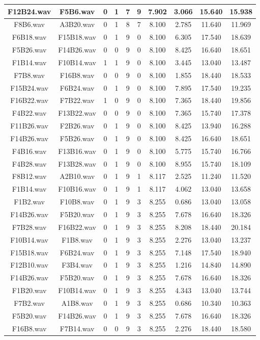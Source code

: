 \documentclass[11pt,a4paper]{book}
\begin{document}
\begin{longtable}[c]{|c|c|c|c|c|c|c|c|c|c|}
F12B24.wav&F5B6.wav&0&1&7&9&7.902&3.066&15.640&15.938\\ \hline
F8B6.wav&A3B20.wav&0&1&8&7&8.100&2.785&11.640&11.969\\ \hline
F6B18.wav&F15B18.wav&0&1&9&0&8.100&6.305&17.540&18.639\\ \hline
F5B26.wav&F14B26.wav&0&0&9&0&8.100&8.425&16.640&18.651\\ \hline
F1B14.wav&F10B14.wav&1&1&9&0&8.100&3.445&13.040&13.487\\ \hline
F7B8.wav&F16B8.wav&0&0&9&0&8.100&1.855&18.440&18.533\\ \hline
F15B24.wav&F6B24.wav&0&1&9&0&8.100&7.895&17.540&19.235\\ \hline
F16B22.wav&F7B22.wav&1&0&9&0&8.100&7.365&18.440&19.856\\ \hline
F4B22.wav&F13B22.wav&0&0&9&0&8.100&7.365&15.740&17.378\\ \hline
F11B26.wav&F2B26.wav&0&1&9&0&8.100&8.425&13.940&16.288\\ \hline
F14B26.wav&F5B26.wav&0&1&9&0&8.100&8.425&16.640&18.651\\ \hline
F4B16.wav&F13B16.wav&0&1&9&0&8.100&5.775&15.740&16.766\\ \hline
F4B28.wav&F13B28.wav&0&1&9&0&8.100&8.955&15.740&18.109\\ \hline
F8B12.wav&A2B10.wav&0&1&9&1&8.117&2.525&11.240&11.520\\ \hline
F1B14.wav&F10B16.wav&0&1&9&1&8.117&4.062&13.040&13.658\\ \hline
F1B2.wav&F10B8.wav&0&1&9&3&8.255&0.686&13.040&13.058\\ \hline
F14B26.wav&F5B20.wav&0&1&9&3&8.255&7.678&16.640&18.326\\ \hline
F7B28.wav&F16B22.wav&0&1&9&3&8.255&8.208&18.440&20.184\\ \hline
F10B14.wav&F1B8.wav&0&1&9&3&8.255&2.276&13.040&13.237\\ \hline
F15B18.wav&F6B24.wav&0&1&9&3&8.255&7.148&17.540&18.940\\ \hline
F12B10.wav&F3B4.wav&0&1&9&3&8.255&1.216&14.840&14.890\\ \hline
F14B26.wav&F5B20.wav&0&1&9&3&8.255&7.678&16.640&18.326\\ \hline
F1B20.wav&F10B14.wav&0&1&9&3&8.255&4.343&13.040&13.744\\ \hline
F7B2.wav&A1B8.wav&0&1&9&3&8.255&0.686&10.340&10.363\\ \hline
F5B20.wav&F14B26.wav&0&1&9&3&8.255&7.678&16.640&18.326\\ \hline
F16B8.wav&F7B14.wav&0&0&9&3&8.255&2.276&18.440&18.580\\ \hline

\end{longtable}
\end{document}
